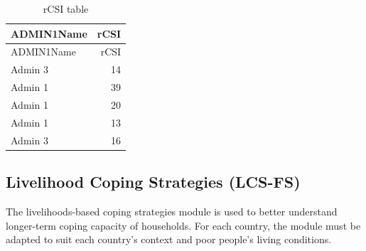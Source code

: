 \documentclass[
  letterpaper,
  DIV=11,
  numbers=noendperiod]{scrreprt}
\begin{document}
\begin{longtable}[]{@{}lr@{}}
\caption{rCSI table}\tabularnewline
\toprule\noalign{}
ADMIN1Name & rCSI \\
\midrule\noalign{}
\endfirsthead
\toprule\noalign{}
ADMIN1Name & rCSI \\
\midrule\noalign{}
\endhead
\bottomrule\noalign{}
\endlastfoot
Admin 3 & 14 \\
Admin 1 & 39 \\
Admin 1 & 20 \\
Admin 1 & 13 \\
Admin 3 & 16 \\
\end{longtable}

\subsection{Livelihood Coping Strategies
(LCS-FS)}\label{livelihood-coping-strategies-lcs-fs}

The livelihoods-based coping strategies module is used to better
understand longer-term coping capacity of households. For each country,
the module must be adapted to suit each country's context and poor
people's living conditions.
\end{document}
